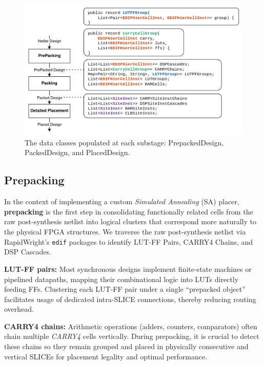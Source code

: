 \documentclass[twocolumn]{article}
\begin{document}
    \begin{figure}[]
        \centering
        \includegraphics[width=14.0cm]{figures/substages.png}
        \caption{The data classes populated at each substage: PrepackedDesign, PackedDesign, and PlacedDesign.}
        \label{fig:substages}
    \end{figure}

    \subsection{Prepacking}
        \label{subsec:prepacking}

        In the context of implementing a custom \emph{Simulated Annealing} (SA) placer, \textbf{prepacking} is the first step in consolidating functionally related cells from the raw post-synthesis netlist into logical clusters that correspond more naturally to the physical FPGA structures. 
        We traverse the raw post-synthesis netlist via RapidWright’s \texttt{edif} packages to identify LUT-FF Pairs, CARRY4 Chains, and DSP Cascades.

        \textbf{LUT-FF pairs:} \quad
            Most synchronous designs implement finite-state machines or pipelined datapaths, mapping their combinational logic into LUTs directly feeding FFs. 
            Clustering each LUT-FF pair under a single “prepacked object” facilitates usage of dedicated intra-SLICE connections, thereby reducing routing overhead.

        \textbf{CARRY4 chains:} \quad
            Arithmetic operations (adders, counters, comparators) often chain multiple \emph{CARRY4} cells vertically. 
            During prepacking, it is crucial to detect these chains so they remain grouped and placed in physically consecutive and vertical SLICEs for placement legality and optimal performance.
\end{document}

